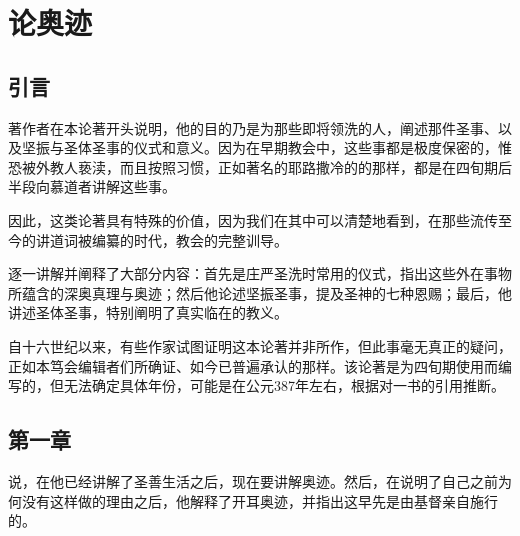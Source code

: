 
\chapter{论奥迹}



\section{引言}

著作者在本论著开头说明，他的目的乃是为那些即将领洗的人，阐述那件圣事、以及坚振与圣体圣事的仪式和意义。因为在早期教会中，这些事都是极度保密的，惟恐被外教人亵渎，而且按照习惯，正如著名的耶路撒冷的的那样，都是在四旬期后半段向慕道者讲解这些事。\par

因此，这类论著具有特殊的价值，因为我们在其中可以清楚地看到，在那些流传至今的讲道词被编纂的时代，教会的完整训导。\par

逐一讲解并阐释了大部分内容：首先是庄严圣洗时常用的仪式，指出这些外在事物所蕴含的深奥真理与奥迹；然后他论述坚振圣事，提及圣神的七种恩赐；最后，他讲述圣体圣事，特别阐明了真实临在的教义。\par

自十六世纪以来，有些作家试图证明这本论著并非所作，但此事毫无真正的疑问，正如本笃会编辑者们所确证、如今已普遍承认的那样。该论著是为四旬期使用而编写的，但无法确定具体年份，可能是在公元387年左右，根据对一书的引用推断。\par


\section{第一章}

说，在他已经讲解了圣善生活之后，现在要讲解奥迹。然后，在说明了自己之前为何没有这样做的理由之后，他解释了开耳奥迹，并指出这早先是由基督亲自施行的。\par

